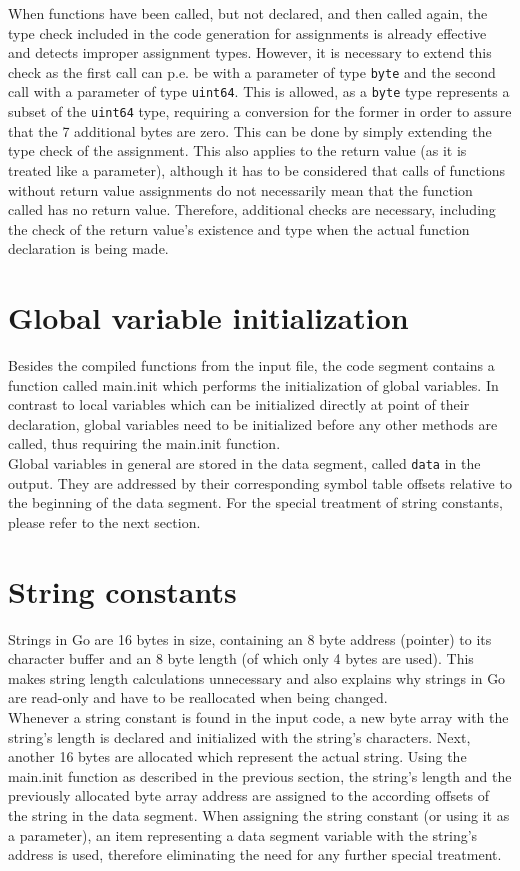\documentclass[a4paper]{scrreprt}
\begin{document}
      When functions have been called, but not declared, and then called again, the type check included in the code generation for assignments is already effective and detects improper assignment types. However, it is necessary to extend this check as the first call can p.e. be with a parameter of type \texttt{byte} and the second call with a parameter of type \texttt{uint64}. This is allowed, as a \texttt{byte} type represents a subset of the \texttt{uint64} type, requiring a conversion for the former in order to assure that the 7 additional bytes are zero. This can be done by simply extending the type check of the assignment. This also applies to the return value (as it is treated like a parameter), although it has to be considered that calls of functions without return value assignments do not necessarily mean that the function called has no return value. Therefore, additional checks are necessary, including the check of the return value's existence and type when the actual function declaration is being made.

    \section{Global variable initialization}
        Besides the compiled functions from the input file, the code segment contains a function called main.init which performs the initialization of global variables. In contrast to local variables which can be initialized directly at point of their declaration, global variables need to be initialized before any other methods are called, thus requiring the main.init function.\\
        Global variables in general are stored in the data segment, called \texttt{data} in the output. They are addressed by their corresponding symbol table offsets relative to the beginning of the data segment. For the special treatment of string constants, please refer to the next section.

    \section{String constants} \label{String constants}
        Strings in Go are 16 bytes in size, containing an 8 byte address (pointer) to its character buffer and an 8 byte length (of which only 4 bytes are used). This makes string length calculations unnecessary and also explains why strings in Go are read-only and have to be reallocated when being changed.\\
        Whenever a string constant is found in the input code, a new byte array with the string's length is declared and initialized with the string's characters. Next, another 16 bytes are allocated which represent the actual string. Using the main.init function as described in the previous section, the string's length and the previously allocated byte array address are assigned to the according offsets of the string in the data segment. When assigning the string constant (or using it as a parameter), an item representing a data segment variable with the string's address is used, therefore eliminating the need for any further special treatment.
\end{document}
